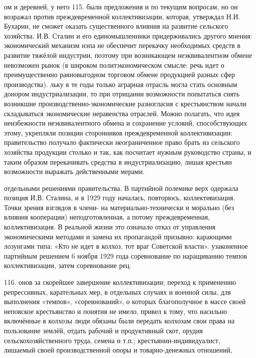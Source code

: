 ом и деревней, у него 115. были предложения и по текущим вопросам, но он возражал против преждевременной коллективизации, которая, утверждал Н.И. Бухарин, не сможет оказать существенного влияния на развитие сельского хозяйства. И.В. Сталин и его единомышленники придерживались другого мнения: экономический механизм нэпа не обеспечит перекачку необходимых средств в развитие тяжёлой индустрии, поэтому при возникающем неэквивалентном обмене невозможен рынок (в широком политэкономическом смысле: речь идет о преимущественно равновыгодном торговом обмене продукцией разных сфер производства).
\clearpage
льку в те годы только аграрная отрасль могла стать основным донором индустриализации, то при отрицании возможности попытаться снять возникшие производственно-экономические разногласия с крестьянством начали складываться экономические неравенства отраслей. Можно полагать, что идея неизбежности неэквивалентного обмена и сохранение условий, способствующих этому, укрепляли позиции сторонников преждевременной коллективизации: правительство получало фактически неограниченное право брать из сельского хозяйства продукции столько и так, как посчитает нужным руководство страны, и таким образом перекачивать средства в индустриализацию, лишая крестьян возможности выражать действенными мерами.

отдельными решениями правительства. В партийной полемике верх одержала позиция И.В. Сталина, и в 1929 году началась, повторюсь, коллективизация. Точки зрения взглядов в члени- на материально-технически и морально (без влияния кооперации) неподготовленная, а потому преждевременная, коллективизация. В реальной жизни это означало отказ от управления экономическими методами и замена их пропагандой призывно: карающими лозунгами типа: «Кто не идет в колхоз, тот враг Советской власти». узаконенное партийным решением 6 ноября 1929 года соревнование по наращиванию темпов коллективизации, затем соревнование рец.

116. онов за скорейшее завершение коллективизации; переход к применению репрессивных, карательных мер, в отдельных случаях и военной силы, для выполнения «темпов», «соревнований», о которых благополучное в массе своей неповское крестьянство и понятия не имело, привел к тому, что насильно включённые в колхозы люди обязаны были передать колхозам свои права на пользование землёй, отдать рабочий и продуктивный скот, орудия сельскохозяйственного труда, семена и т.п.; крестьянин-индивидуалист, лишаемый своей производственной опоры и товарно-денежных отношений,

